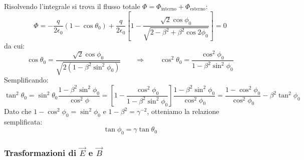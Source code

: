 Risolvendo l'integrale si trova il flusso totale $ \Phi = \Phi_{\text{interno}} + \Phi_{\text{esterno}} $:
\begin{equation}
	\Phi = -\frac{q}{2\epsilon_0} (1-\cos\theta_0) + \frac{q}{2\epsilon_0} \left[ 1 - \frac{\sqrt{2}\cos\phi_0}{\sqrt{2 - \beta^2 + \beta^2 \cos2\phi_0}} \right] = 0
	\label{eq:35}
\end{equation}
da cui:
\begin{equation}
	\cos\theta_0 = \frac{\sqrt{2}\cos\phi_0}{\sqrt{2(1 - \beta^2\sin^2\phi_0)}} \qquad\Longrightarrow\qquad \cos^2\theta_0 = \frac{\cos^2\phi_0}{1 - \beta^2\sin^2\phi_0}
	\label{eq:36}
\end{equation}
Semplificando:
\begin{equation}
	\tan^2\theta_0 = \sin^2\theta_0 \frac{1 - \beta^2\sin^2\phi_0}{\cos^2\phi} = \left[1 - \frac{\cos^2\phi_0}{1 - \beta^2\sin^2\phi_0} \right] \frac{1 - \beta^2\sin^2\phi_0}{\cos^2\phi_0} = \frac{1 - \cos^2\phi_0}{\cos^2\phi_0} - \beta^2\tan^2\phi_0
	\label{eq:37}
\end{equation}
Dato che $ 1 - \cos^2\phi_0 = \sin^2\phi_0 $ e $ 1 - \beta^2 = \gamma^{-2} $, otteniamo la relazione semplificata:
\begin{equation}
	\tan\phi_0 = \gamma\tan\theta_0
	\label{eq:38}
\end{equation}

\subsubsection{Trasformazioni di $ \vec{E} $ e $ \vec{B} $}

